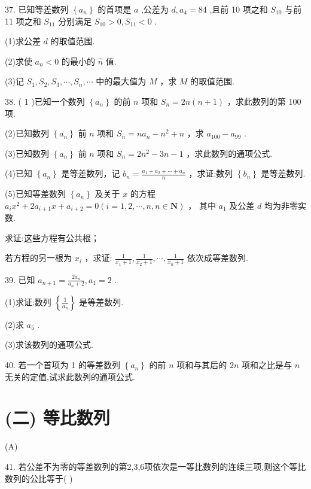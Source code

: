 \documentclass[10pt]{article}
\newcommand*\circled[1]{\tikz[baseline=(char.base)]{\node[shape=circle,draw,inner sep=1.5pt] (char) {\small #1};}}
\begin{document}
37. 已知等差数列 \(\left\{  {a}_{n}\right\}\) 的首项是 \(a\) ,公差为 \(d,{a}_{4} = {84}\) ,且前 10 项之和 \({S}_{10}\) 与前 11 项之和 \({S}_{11}\) 分别满足 \({S}_{10} > 0,{S}_{11} < 0\) .

(1)求公差 \(d\) 的取值范围.

(2)求使 \({a}_{n} < 0\) 的最小的 \(\widehat{n}\) 值.

(3)记 \({S}_{1},{S}_{2},{S}_{3},\cdots ,{S}_{n},\cdots\) 中的最大值为 \(M\) ，求 \(M\) 的取值范围.

38. ( 1 )已知一个数列 \(\left\{  {a}_{n}\right\}\) 的前 \(n\) 项和 \({S}_{n} = {2n}\left( {n + 1}\right)\) ，求此数列的第 100 项.

(2)已知数列 \(\left\{  {a}_{n}\right\}\) 前 \(n\) 项和 \({S}_{n} = n{a}_{n} - {n}^{2} + n\) ，求 \({a}_{100} - {a}_{99}\) .

(3)已知数列 \(\left\{  {a}_{n}\right\}\) 前 \(n\) 项和 \({S}_{n} = 2{n}^{2} - {3n} - 1\) ，求此数列的通项公式.

(4)已知 \(\left\{  {a}_{n}\right\}\) 是等差数列，记 \({b}_{n} = \frac{{a}_{1} + {a}_{2} + \cdots  + {a}_{n}}{n}\) ，求证:数列 \(\left\{  {b}_{n}\right\}\) 是等差数列.

(5)已知等差数列 \(\left\{  {a}_{n}\right\}\) 及关于 \(x\) 的方程 \({a}_{i}{x}^{2} + 2{a}_{i + 1}x + {a}_{i + 2} = 0\left( {i = 1,2,\cdots ,n,n \in  \mathbf{N}}\right)\) ， 其中 \({a}_{1}\) 及公差 \(d\) 均为非零实数.

 \circled{1}  求证:这些方程有公共根；

 \circled{2} 若方程的另一根为 \({x}_{i}\) ，求证: \(\frac{1}{{x}_{1} + 1},\frac{1}{{x}_{2} + 1},\cdots ,\frac{1}{{x}_{n} + 1}\) 依次成等差数列.

39. 已知 \({a}_{n + 1} = \frac{2{a}_{n}}{{a}_{n} + 2},{a}_{1} = 2\) .

(1)求证:数列 \(\left\{  \frac{1}{{a}_{n}}\right\}\) 是等差数列.

(2)求 \({a}_{5}\) .

(3)求该数列的通项公式.

40. 若一个首项为 1 的等差数列 \(\left\{  {a}_{n}\right\}\) 的前 \(n\) 项和与其后的 \({2n}\) 项和之比是与 \(n\) 无关的定值,试求此数列的通项公式.

\section*{(二) 等比数列}

(A)

41. 若公差不为零的等差数列的第2,3,6项依次是一等比数列的连续三项,则这个等比数列的公比等于( )
\end{document}
